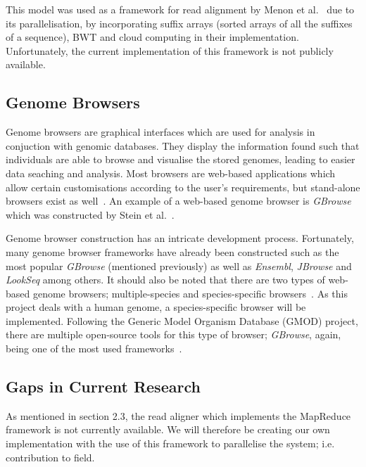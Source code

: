 \documentclass{csfyp}
\begin{document}
\begin{small}
This model was used as a framework for read alignment by Menon et al.~\cite{mapredgen} due to its parallelisation, by incorporating suffix arrays (sorted arrays of all the suffixes of a sequence), BWT and cloud computing in their implementation.  Unfortunately, the current implementation of this framework is not publicly available.            

\subsection{Genome Browsers}\vspace{-4ex}
Genome browsers are graphical interfaces which are used for analysis in conjuction with genomic databases.  They display the information found such that individuals are able to browse and visualise the stored genomes, leading to easier data seaching and analysis.  Most browsers are web-based applications which allow certain customisations according to the user's requirements, but stand-alone browsers exist as well~\cite{webbrowser, genericbrowser}.  An example of a web-based genome browser is {\textit{GBrowse}} which was constructed by Stein et al.~\cite{genericbrowser}. 
 
Genome browser construction has an intricate development process.  Fortunately, many genome browser frameworks have already been constructed such as the most popular {\textit{GBrowse}} (mentioned previously) as well as {\textit{Ensembl}}, {\textit{JBrowse}} and {\textit{LookSeq}} among others.  It should also be noted that there are two types of web-based genome browsers; multiple-species and species-specific browsers~\cite{webbrowser}.  As this project deals with a human genome, a species-specific browser will be implemented.  Following the Generic Model Organism Database (GMOD) project, there are multiple open-source tools for this type of browser; {\textit{GBrowse}}, again, being one of the most used frameworks~\cite{webbrowser}.              

\subsection{Gaps in Current Research}\vspace{-4ex}
As mentioned in section 2.3, the read aligner which implements the MapReduce framework is not currently available.  We will therefore be creating our own implementation with the use of this framework to parallelise the system; i.e. contribution to field.     
     


\end{small}
\end{document}

